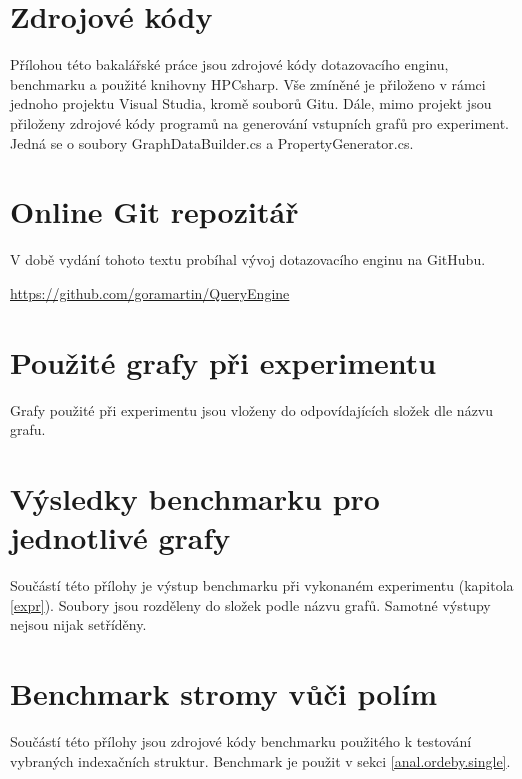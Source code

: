 \section{Zdrojové kódy}
\label{prilohy.kod}

Přílohou této bakalářské práce jsou zdrojové kódy dotazovacího enginu, benchmarku a použité knihovny HPCsharp.
Vše zmíněné je přiloženo v rámci jednoho projektu Visual Studia, kromě souborů Gitu. Dále, mimo projekt jsou přiloženy
zdrojové kódy programů na generování vstupních grafů pro experiment. Jedná se o soubory GraphDataBuilder.cs a PropertyGenerator.cs.

\section{Online Git repozitář}
\label{prilohy.repo}

V době vydání tohoto textu probíhal vývoj dotazovacího enginu na GitHubu.

\begin{center}
\url{https://github.com/goramartin/QueryEngine}
\end{center}

\section{Použité grafy při experimentu}
\label{prilohy.grafy}

Grafy použité při experimentu jsou vloženy do odpovídajících složek dle názvu grafu. 

\section{Výsledky benchmarku pro jednotlivé grafy}
\label{prilohy.grafyVysledky}

Součástí této přílohy je výstup benchmarku při vykonaném experimentu (kapitola \ref{expr}).
Soubory jsou rozděleny do složek podle názvu grafů.
Samotné výstupy nejsou nijak setříděny.

\section{Benchmark stromy vůči polím}
\label{prilohy.benchtreevsarray}

Součástí této přílohy jsou zdrojové kódy benchmarku použitého k testování vybraných indexačních struktur.
Benchmark je použit v sekci \ref{anal.ordeby.single}.